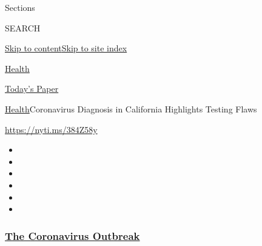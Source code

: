 Sections

SEARCH

\protect\hyperlink{site-content}{Skip to
content}\protect\hyperlink{site-index}{Skip to site index}

\href{https://www.nytimes3xbfgragh.onion/section/health}{Health}

\href{https://myaccount.nytimes3xbfgragh.onion/auth/login?response_type=cookie\&client_id=vi}{}

\href{https://www.nytimes3xbfgragh.onion/section/todayspaper}{Today's
Paper}

\href{/section/health}{Health}\textbar{}Coronavirus Diagnosis in
California Highlights Testing Flaws

\url{https://nyti.ms/384Z58y}

\begin{itemize}
\item
\item
\item
\item
\item
\item
\end{itemize}

\hypertarget{the-coronavirus-outbreak}{%
\subsubsection{\texorpdfstring{\href{https://www.nytimes3xbfgragh.onion/news-event/coronavirus?name=styln-coronavirus-national\&region=TOP_BANNER\&variant=undefined\&block=storyline_menu_recirc\&action=click\&pgtype=Article\&impression_id=d1641300-e3af-11ea-a964-3f8cb8589728}{The
Coronavirus
Outbreak}}{The Coronavirus Outbreak}}\label{the-coronavirus-outbreak}}


